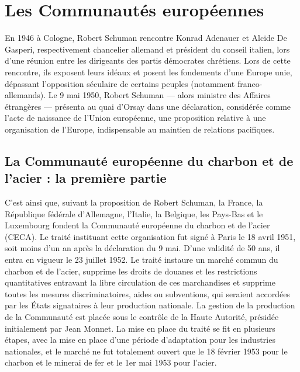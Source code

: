 \documentclass{report}%
\begin{document}
\chapter{Les Communautés européennes}

En 1946 à Cologne, Robert Schuman rencontre Konrad Adenauer et Alcide De Gasperi, respectivement chancelier allemand et président du conseil italien, lors d'une réunion entre les dirigeants des partis démocrates chrétiens. Lors de cette rencontre, ils exposent leurs idéaux et posent les fondements d'une Europe unie, dépassant l'opposition séculaire de certains peuples (notamment franco-allemands).
Le 9 mai 1950, Robert Schuman — alors ministre des Affaires étrangères — présenta au quai d'Orsay dans une déclaration, considérée comme l'acte de naissance de l'Union européenne, une proposition relative à une organisation de l'Europe, indispensable au maintien de relations pacifiques.
\section{La Communauté européenne du charbon et de l'acier : la première partie}
C'est ainsi que, suivant la proposition de Robert Schuman, la France, la République fédérale d'Allemagne, l'Italie, la Belgique, les Pays-Bas et le Luxembourg fondent la Communauté européenne du charbon et de l'acier (CECA). Le traité instituant cette organisation fut signé à Paris le 18 avril 1951, soit moins d'un an après la déclaration du 9 mai. D'une validité de 50 ans, il entra en vigueur le 23 juillet 1952.
Le traité instaure un marché commun du charbon et de l'acier, supprime les droits de douanes et les restrictions quantitatives entravant la libre circulation de ces marchandises et supprime toutes les mesures discriminatoires, aides ou subventions, qui seraient accordées par les États signataires à leur production nationale. La gestion de la production de la Communauté est placée sous le contrôle de la Haute Autorité, présidée initialement par Jean Monnet.
La mise en place du traité se fit en plusieurs étapes, avec la mise en place d'une période d'adaptation pour les industries nationales, et le marché ne fut totalement ouvert que le 18 février 1953 pour le charbon et le minerai de fer et le 1er mai 1953 pour l'acier.
\end{document}
